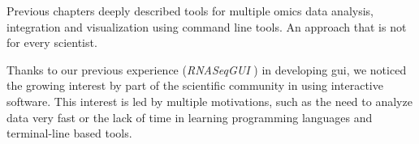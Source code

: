 %
%
%
%
%

Previous chapters deeply described tools for multiple omics data analysis, integration and visualization using command line tools.
An approach that is not for every scientist.

Thanks to our previous experience (\textit{RNASeqGUI} \cite{russo2015advantages}) in developing \gls{gui}, we noticed the growing interest by part of the scientific community in using interactive software.
This interest is led by multiple motivations, such as the need to analyze data very fast or the lack of time in learning programming languages and terminal-line based tools.

